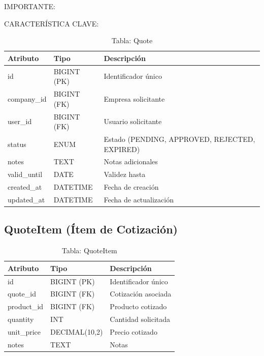 \documentclass[12pt,a4paper,oneside]{book}
\begin{document}
\begin{alert}{IMPORTANTE:}
\begin{info}{CARACTERÍSTICA CLAVE:}
\begin{table}[ht]
    \centering
    \caption{Tabla: Quote}
    \begin{tabular}{@{}lll@{}}
        \toprule
        \textbf{Atributo} & \textbf{Tipo} & \textbf{Descripción} \\
        \midrule
        id & BIGINT (PK) & Identificador único \\
        company\_id & BIGINT (FK) & Empresa solicitante \\
        user\_id & BIGINT (FK) & Usuario solicitante \\
        status & ENUM & Estado (PENDING, APPROVED, REJECTED, EXPIRED) \\
        notes & TEXT & Notas adicionales \\
        valid\_until & DATE & Validez hasta \\
        created\_at & DATETIME & Fecha de creación \\
        updated\_at & DATETIME & Fecha de actualización \\
        \bottomrule
    \end{tabular}
\end{table}

\subsection{QuoteItem (Ítem de Cotización)}
\label{sec:quoteitem}

\begin{table}[ht]
    \centering
    \caption{Tabla: QuoteItem}
    \begin{tabular}{@{}lll@{}}
        \toprule
        \textbf{Atributo} & \textbf{Tipo} & \textbf{Descripción} \\
        \midrule
        id & BIGINT (PK) & Identificador único \\
        quote\_id & BIGINT (FK) & Cotización asociada \\
        product\_id & BIGINT (FK) & Producto cotizado \\
        quantity & INT & Cantidad solicitada \\
        unit\_price & DECIMAL(10,2) & Precio cotizado \\
        notes & TEXT & Notas \\
        \bottomrule
    \end{tabular}
\end{table}


\end{info}
\end{alert}
\end{document}

